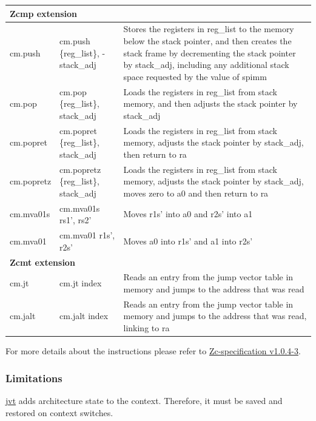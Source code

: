 \documentclass[main\_\_EN.tex]{subfiles}
\begin{document}
\begin{longtable}{ | p{2.0cm} | p{4.0cm} |  p{10.0cm} | }
\multicolumn{3}{|l|}{\textbf{Zcmp extension}} \\\hline

cm.push & cm.push \{reg\_list\}, -stack\_adj & Stores the registers in reg\_list to the memory below the stack pointer, and then creates the stack frame by decrementing the stack pointer by stack\_adj, including any additional stack space requested by the value of spimm\\\hline
cm.pop & cm.pop \{reg\_list\}, stack\_adj & Loads the registers in reg\_list from stack memory, and then adjusts the stack pointer by stack\_adj \\\hline
cm.popret & cm.popret \{reg\_list\}, stack\_adj & Loads the registers in reg\_list from stack memory, adjusts the stack pointer by stack\_adj, then return to ra\\\hline
cm.popretz & cm.popretz \{reg\_list\}, stack\_adj & Loads the registers in reg\_list from stack memory, adjusts the stack pointer by stack\_adj, moves zero to a0 and then return to ra\\\hline
cm.mva01s & cm.mva01s rs1', rs2' &  Moves r1s' into a0 and r2s' into a1\\\hline
cm.mva01 & cm.mva01 r1s', r2s' & Moves a0 into r1s' and a1 into r2s' \\\hline

\multicolumn{3}{|l|}{\textbf{Zcmt extension}} \\\hline

cm.jt & cm.jt index & Reads an entry from the jump vector table in memory and jumps to the address that was read \\\hline
cm.jalt & cm.jalt index & Reads an entry from the jump vector table in memory and jumps to the address that was read, linking to ra  \\\hline

\end{longtable}

For more details about the instructions please refer to \href{https://github.com/riscvarchive/riscv-code-size-reduction/blob/v1.0.4-3/Zc-specification/Zc.adoc}{Zc-specification v1.0.4-3}.

\subsubsection{Limitations}
\label{sec:riscvcpu-zc-limit-descr}

\hyperref[regdesc:JVT]{jvt} adds architecture state to the context. Therefore, it must be saved and restored on context switches.
\end{document}
